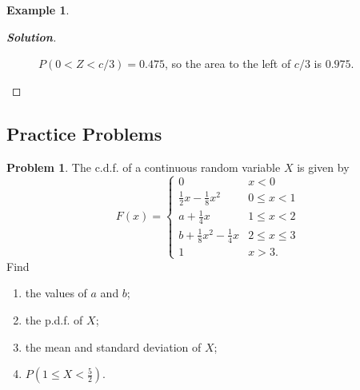 \documentclass[12pt,a4paper]{report}
\theoremstyle{definition}
\newtheorem{example}[thm]{Example}
\theoremstyle{plain}
\theoremstyle{definition}
\newtheorem{problemx}{Problem}[section]
\newenvironment{problem}{\begin{problemx}}{\end{problemx}}
\begin{document}
\begin{example}
\begin{enumerate}
\begin{proof}[\textbf{\textit{Solution}}]
\begin{figure}[H]
\centering
{}
\caption{$P(0<Z<c/3)=0.475$, so the area to the left of $c/3$ is $0.975$.}
\end{figure}
\end{proof}
\end{enumerate}
\end{example}

















\subsection{Practice Problems}

\begin{problem}
The c.d.f. of a continuous random variable $X$ is given by
\[F(x) = \begin{cases}
0 & x<0\\[2pt]
\frac{1}{2}x-\frac{1}{8}x^2 & 0\leq x<1\\[6pt]
a+\frac{1}{4}x & 1\leq x<2\\[6pt]
b+\frac{1}{8}x^2-\frac{1}{4}x & 2\leq x\leq 3\\[6pt]
1 & x>3.
\end{cases}\]
Find
\begin{enumerate}
\item[(a).] the values of $a$ and $b$;
\item[(b).] the p.d.f. of $X$;
\item[(c).] the mean and standard deviation of $X$;
\item[(d).] $P\left(1\leq X<\frac{5}{2}\right)$.
\end{enumerate}
\end{problem}
\end{document}
